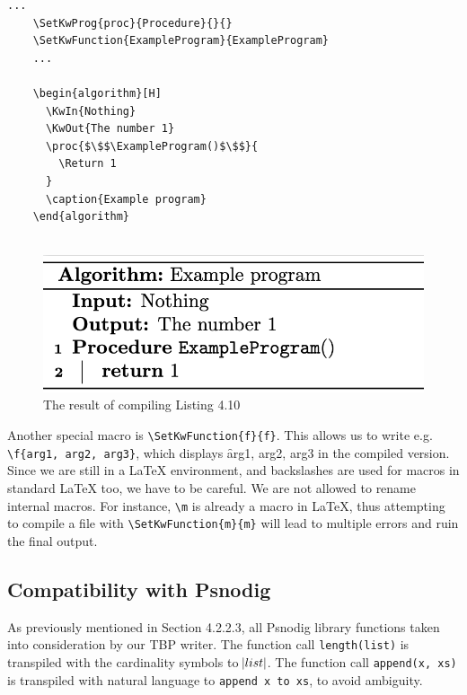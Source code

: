 \begin{lstlisting}[caption={Example program with Algorithm2e to show macros in action}, captionpos=b]
    ...
    \SetKwProg{proc}{Procedure}{}{}
    \SetKwFunction{ExampleProgram}{ExampleProgram}
    ...
        
    \begin{algorithm}[H]
      \KwIn{Nothing}
      \KwOut{The number 1}
      \proc{$\$$\ExampleProgram()$\$$}{
        \Return 1
      }
      \caption{Example program}
    \end{algorithm}
    
\end{lstlisting}

\begin{figure}[ht]
    \centering
    \includegraphics[scale=0.6]{assets/exampleProgramAlgorithm2e.png}
    \caption{The result of compiling Listing 4.10}
    \label{fig:algorithm2e_mini_example}
\end{figure}

Another special macro is \texttt{\textbackslash SetKwFunction\{f\}\{f\}}. This allows us to write e.g. \texttt{\textbackslash f\{arg1, arg2, arg3\}}, which displays \f{arg1, arg2, arg3} in the compiled version. \hfill \\

Since we are still in a LaTeX environment, and backslashes are used for macros in standard LaTeX too, we have to be careful. We are not allowed to rename internal macros. For instance, \texttt{\textbackslash m} is already a macro in LaTeX, thus attempting to compile a file with \texttt{\textbackslash SetKwFunction\{m\}\{m\}} will lead to multiple errors and ruin the final output.

\subsection{Compatibility with Psnodig}

As previously mentioned in Section 4.2.2.3, all Psnodig library functions taken into consideration by our TBP writer. The function call \texttt{length(list)} is transpiled with the cardinality symbols to \hspace{.01cm} $\abs{list}$. The function call \texttt{append(x, xs)} is transpiled with natural language to \texttt{append x to xs}, to avoid ambiguity. \hfill \\

